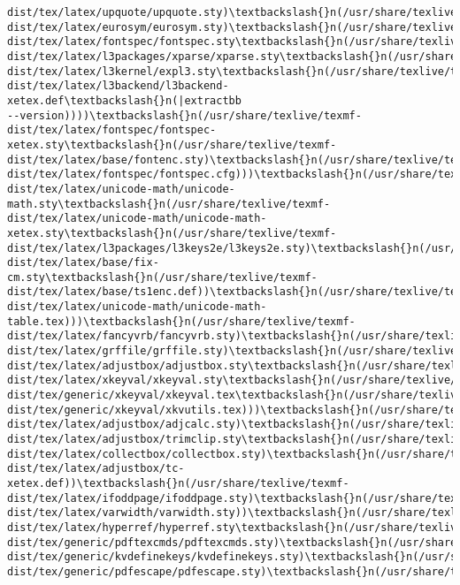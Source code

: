\documentclass[11pt]{article}
\begin{document}
\begin{Verbatim}[commandchars=\\\{\}]
dist/tex/latex/upquote/upquote.sty)\textbackslash{}n(/usr/share/texlive/texmf-
dist/tex/latex/eurosym/eurosym.sty)\textbackslash{}n(/usr/share/texlive/texmf-
dist/tex/latex/fontspec/fontspec.sty\textbackslash{}n(/usr/share/texlive/texmf-
dist/tex/latex/l3packages/xparse/xparse.sty\textbackslash{}n(/usr/share/texlive/texmf-
dist/tex/latex/l3kernel/expl3.sty\textbackslash{}n(/usr/share/texlive/texmf-
dist/tex/latex/l3backend/l3backend-xetex.def\textbackslash{}n(|extractbb
--version))))\textbackslash{}n(/usr/share/texlive/texmf-dist/tex/latex/fontspec/fontspec-
xetex.sty\textbackslash{}n(/usr/share/texlive/texmf-
dist/tex/latex/base/fontenc.sty)\textbackslash{}n(/usr/share/texlive/texmf-
dist/tex/latex/fontspec/fontspec.cfg)))\textbackslash{}n(/usr/share/texlive/texmf-
dist/tex/latex/unicode-math/unicode-math.sty\textbackslash{}n(/usr/share/texlive/texmf-
dist/tex/latex/unicode-math/unicode-math-xetex.sty\textbackslash{}n(/usr/share/texlive/texmf-
dist/tex/latex/l3packages/l3keys2e/l3keys2e.sty)\textbackslash{}n(/usr/share/texlive/texmf-
dist/tex/latex/base/fix-cm.sty\textbackslash{}n(/usr/share/texlive/texmf-
dist/tex/latex/base/ts1enc.def))\textbackslash{}n(/usr/share/texlive/texmf-
dist/tex/latex/unicode-math/unicode-math-
table.tex)))\textbackslash{}n(/usr/share/texlive/texmf-
dist/tex/latex/fancyvrb/fancyvrb.sty)\textbackslash{}n(/usr/share/texlive/texmf-
dist/tex/latex/grffile/grffile.sty)\textbackslash{}n(/usr/share/texlive/texmf-
dist/tex/latex/adjustbox/adjustbox.sty\textbackslash{}n(/usr/share/texlive/texmf-
dist/tex/latex/xkeyval/xkeyval.sty\textbackslash{}n(/usr/share/texlive/texmf-
dist/tex/generic/xkeyval/xkeyval.tex\textbackslash{}n(/usr/share/texlive/texmf-
dist/tex/generic/xkeyval/xkvutils.tex)))\textbackslash{}n(/usr/share/texlive/texmf-
dist/tex/latex/adjustbox/adjcalc.sty)\textbackslash{}n(/usr/share/texlive/texmf-
dist/tex/latex/adjustbox/trimclip.sty\textbackslash{}n(/usr/share/texlive/texmf-
dist/tex/latex/collectbox/collectbox.sty)\textbackslash{}n(/usr/share/texlive/texmf-
dist/tex/latex/adjustbox/tc-xetex.def))\textbackslash{}n(/usr/share/texlive/texmf-
dist/tex/latex/ifoddpage/ifoddpage.sty)\textbackslash{}n(/usr/share/texlive/texmf-
dist/tex/latex/varwidth/varwidth.sty))\textbackslash{}n(/usr/share/texlive/texmf-
dist/tex/latex/hyperref/hyperref.sty\textbackslash{}n(/usr/share/texlive/texmf-
dist/tex/generic/pdftexcmds/pdftexcmds.sty)\textbackslash{}n(/usr/share/texlive/texmf-
dist/tex/generic/kvdefinekeys/kvdefinekeys.sty)\textbackslash{}n(/usr/share/texlive/texmf-
dist/tex/generic/pdfescape/pdfescape.sty)\textbackslash{}n(/usr/share/texlive/texmf-

\end{Verbatim}
\end{document}
